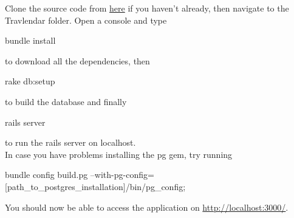 Clone the source code from \href{https://github.com/TommasoBianchi/BettiBianchi_SWENG2}{here} if you haven't already, then navigate to the Travlendar folder. Open a console and type 
\begin{commandshell}bundle install\end{commandshell}
to download all the dependencies, then 
\begin{commandshell}rake db:setup\end{commandshell} to build the database and finally 
\begin{commandshell}rails server\end{commandshell}
to run the rails server on localhost. \\
In case you have problems installing the pg gem, try running 
\begin{commandshell}bundle config build.pg --with-pg-config=[path_to_postgres_installation]/bin/pg_config;\end{commandshell}
You should now be able to access the application on \href{http://localhost:3000/}{http://localhost:3000/}.